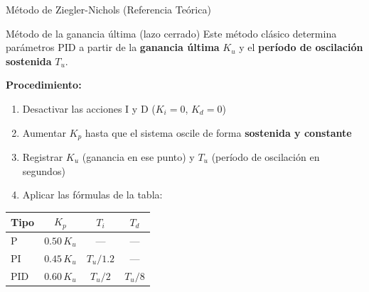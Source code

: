 \documentclass[aspectratio=169,xcolor=dvipsnames]{beamer}
\begin{document}
\begin{frame}{Método de Ziegler-Nichols (Referencia Teórica)}
    \footnotesize
    \begin{block}{Método de la ganancia última (lazo cerrado)}
        Este método clásico determina parámetros PID a partir de la \textbf{ganancia última} $K_u$ y el \textbf{período de oscilación sostenida} $T_u$.
    \end{block}
    \vspace{0.3em}
    \textbf{Procedimiento:}
    \begin{enumerate}
        \item Desactivar las acciones I y D ($K_i = 0$, $K_d = 0$)
        \item Aumentar $K_p$ hasta que el sistema oscile de forma \textbf{sostenida y constante}
        \item Registrar $K_u$ (ganancia en ese punto) y $T_u$ (período de oscilación en segundos)
        \item Aplicar las fórmulas de la tabla:
    \end{enumerate}
    \vspace{0.3em}
    \begin{center}
    \begin{tabular}{lccc}
        \toprule
        \textbf{Tipo} & $K_p$ & $T_i$ & $T_d$ \\
        \midrule
        P & $0.50\, K_u$ & --- & --- \\
        PI & $0.45\, K_u$ & $T_u / 1.2$ & --- \\
        PID & $0.60\, K_u$ & $T_u / 2$ & $T_u / 8$ \\
        \bottomrule
    \end{tabular}
    \end{center}
\end{frame}
\end{document}
